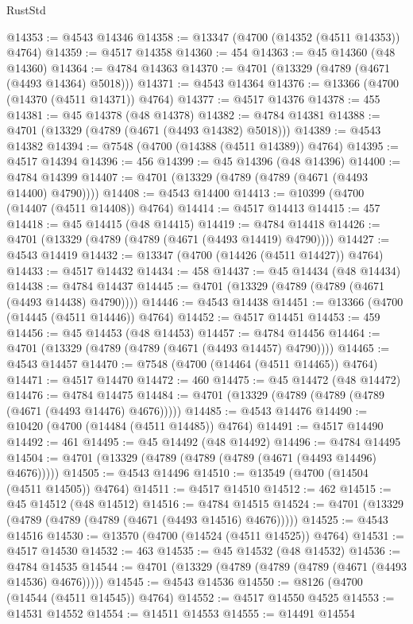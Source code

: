 \begin{lexlean}{RustStd}
\begin{coremodule}
@14353 := @4543 @14346
@14358 := @13347 (@4700 (@14352 (@4511 @14353)) @4764)
@14359 := @4517 @14358
@14360 := 454
@14363 := @45 @14360 (@48 @14360)
@14364 := @4784 @14363
@14370 := @4701 (@13329 (@4789 (@4671 (@4493 @14364) @5018)))
@14371 := @4543 @14364
@14376 := @13366 (@4700 (@14370 (@4511 @14371)) @4764)
@14377 := @4517 @14376
@14378 := 455
@14381 := @45 @14378 (@48 @14378)
@14382 := @4784 @14381
@14388 := @4701 (@13329 (@4789 (@4671 (@4493 @14382) @5018)))
@14389 := @4543 @14382
@14394 := @7548 (@4700 (@14388 (@4511 @14389)) @4764)
@14395 := @4517 @14394
@14396 := 456
@14399 := @45 @14396 (@48 @14396)
@14400 := @4784 @14399
@14407 := @4701 (@13329 (@4789 (@4789 (@4671 (@4493 @14400) @4790))))
@14408 := @4543 @14400
@14413 := @10399 (@4700 (@14407 (@4511 @14408)) @4764)
@14414 := @4517 @14413
@14415 := 457
@14418 := @45 @14415 (@48 @14415)
@14419 := @4784 @14418
@14426 := @4701 (@13329 (@4789 (@4789 (@4671 (@4493 @14419) @4790))))
@14427 := @4543 @14419
@14432 := @13347 (@4700 (@14426 (@4511 @14427)) @4764)
@14433 := @4517 @14432
@14434 := 458
@14437 := @45 @14434 (@48 @14434)
@14438 := @4784 @14437
@14445 := @4701 (@13329 (@4789 (@4789 (@4671 (@4493 @14438) @4790))))
@14446 := @4543 @14438
@14451 := @13366 (@4700 (@14445 (@4511 @14446)) @4764)
@14452 := @4517 @14451
@14453 := 459
@14456 := @45 @14453 (@48 @14453)
@14457 := @4784 @14456
@14464 := @4701 (@13329 (@4789 (@4789 (@4671 (@4493 @14457) @4790))))
@14465 := @4543 @14457
@14470 := @7548 (@4700 (@14464 (@4511 @14465)) @4764)
@14471 := @4517 @14470
@14472 := 460
@14475 := @45 @14472 (@48 @14472)
@14476 := @4784 @14475
@14484 := @4701 (@13329 (@4789 (@4789 (@4789 (@4671 (@4493 @14476) @4676)))))
@14485 := @4543 @14476
@14490 := @10420 (@4700 (@14484 (@4511 @14485)) @4764)
@14491 := @4517 @14490
@14492 := 461
@14495 := @45 @14492 (@48 @14492)
@14496 := @4784 @14495
@14504 := @4701 (@13329 (@4789 (@4789 (@4789 (@4671 (@4493 @14496) @4676)))))
@14505 := @4543 @14496
@14510 := @13549 (@4700 (@14504 (@4511 @14505)) @4764)
@14511 := @4517 @14510
@14512 := 462
@14515 := @45 @14512 (@48 @14512)
@14516 := @4784 @14515
@14524 := @4701 (@13329 (@4789 (@4789 (@4789 (@4671 (@4493 @14516) @4676)))))
@14525 := @4543 @14516
@14530 := @13570 (@4700 (@14524 (@4511 @14525)) @4764)
@14531 := @4517 @14530
@14532 := 463
@14535 := @45 @14532 (@48 @14532)
@14536 := @4784 @14535
@14544 := @4701 (@13329 (@4789 (@4789 (@4789 (@4671 (@4493 @14536) @4676)))))
@14545 := @4543 @14536
@14550 := @8126 (@4700 (@14544 (@4511 @14545)) @4764)
@14552 := @4517 @14550 @4525
@14553 := @14531 @14552
@14554 := @14511 @14553
@14555 := @14491 @14554

\end{coremodule}
\end{lexlean}

